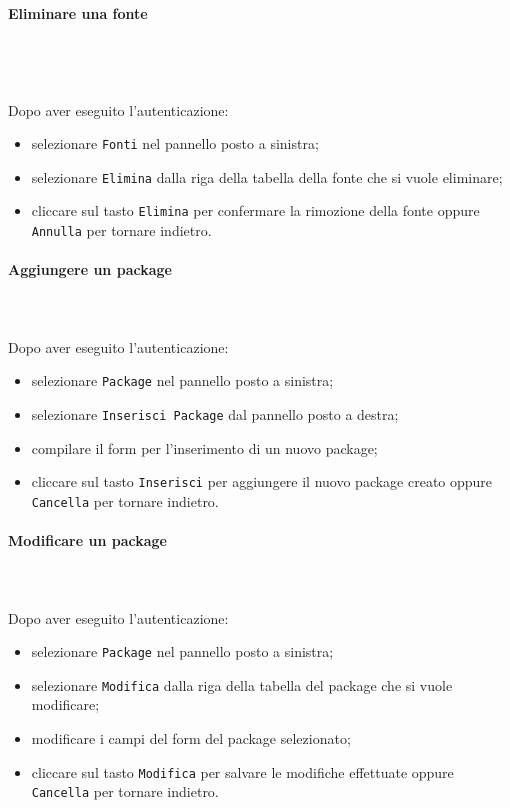 	\paragraph{Eliminare una fonte} \mbox{}\\ \mbox{}\\\\
	Dopo aver eseguito l'autenticazione:
	\begin{itemize}
		\item selezionare \texttt{Fonti} nel pannello posto a sinistra;
		\item selezionare \texttt{Elimina} dalla riga della tabella della fonte 
		che si vuole eliminare;\
		\item cliccare sul tasto \texttt{Elimina} per confermare la rimozione della fonte
		oppure \texttt{Annulla} per tornare indietro.
	\end{itemize}
	
	\paragraph{Aggiungere un package} \mbox{}\\ \mbox{}\\
	Dopo aver eseguito l'autenticazione:
	\begin{itemize}
		\item selezionare \texttt{Package} nel pannello posto a sinistra;
		\item selezionare \texttt{Inserisci Package} dal pannello posto a destra;
		\item compilare il form per l'inserimento di un nuovo package;
		\item cliccare sul tasto \texttt{Inserisci} per aggiungere il nuovo package
		creato oppure \texttt{Cancella} per tornare indietro.	
	\end{itemize}
	
	\paragraph{Modificare un package} \mbox{}\\ \mbox{}\\
	Dopo aver eseguito l'autenticazione:
	\begin{itemize}
		\item selezionare \texttt{Package} nel pannello posto a sinistra;
		\item selezionare \texttt{Modifica} dalla riga della tabella del package
		che si vuole modificare;
		\item modificare i campi del form del package selezionato;
		\item cliccare sul tasto \texttt{Modifica} per salvare le modifiche effettuate
		oppure \texttt{Cancella} per tornare indietro.
	\end{itemize}
	
